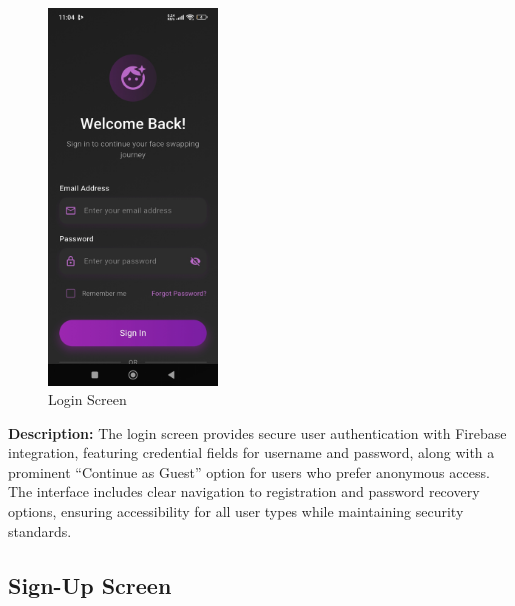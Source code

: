 \documentclass[12pt,a4paper]{report}
\begin{document}
\begin{figure}[H]
\centering
\includegraphics[width=0.4\textwidth]{figures/login_screen.png}
\caption{Login Screen}
\label{fig:login_screen}
\end{figure}

\textbf{Description:} The login screen provides secure user authentication with Firebase integration, featuring credential fields for username and password, along with a prominent ``Continue as Guest'' option for users who prefer anonymous access. The interface includes clear navigation to registration and password recovery options, ensuring accessibility for all user types while maintaining security standards.

\subsection{Sign-Up Screen}
\end{document}

